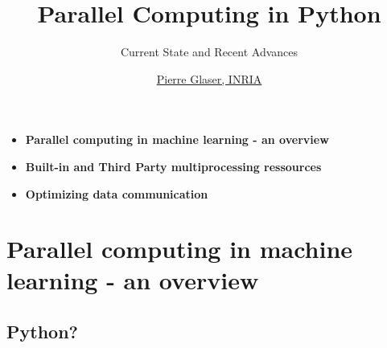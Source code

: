 \documentclass[13pt, usenames,dvipsnames]{beamer} %
\title{Parallel Computing in Python}
\subtitle{Current State and Recent Advances}
\author{\href{http://kbroman.org}{Pierre Glaser, INRIA}
\href{https://github.com/pierreglaser}{\faGithub}
\href{https://twitter.com/pierreglaser}{\faTwitter}}
\begin{document}
\begin{frame}[fragile]{}
    \titlepage
\end{frame}

\vspace{3em}

\begin{frame}[t]{}
    \center
    \vspace{7em}
    \begin{itemize}
        \setlength\itemsep{1em}
        \item[]\textbf{Parallel computing in machine learning - an overview }
        \item[]\textbf{Built-in and Third Party multiprocessing ressources}
        \item[]\textbf{Optimizing data communication}
    \end{itemize}
\end{frame}


\section{Parallel computing in machine learning - an overview}
    \begin{frame}[t]{}
        \vspace{10em}
    \end{frame}
    \subsection{Python? }
\end{document}
